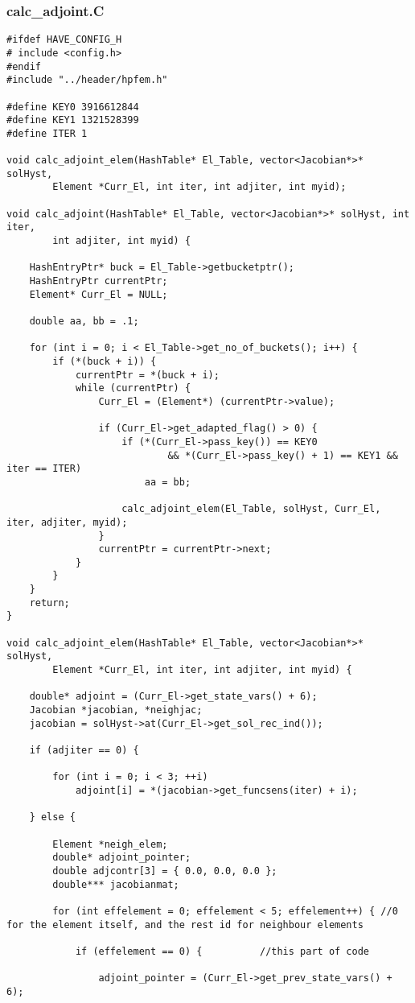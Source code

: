 \documentclass[a4paper,10pt]{article}
\begin{document}
\subsubsection{calc\_adjoint.C}
\begin{lstlisting}
#ifdef HAVE_CONFIG_H
# include <config.h>
#endif
#include "../header/hpfem.h"

#define KEY0 3916612844
#define KEY1 1321528399
#define ITER 1

void calc_adjoint_elem(HashTable* El_Table, vector<Jacobian*>* solHyst,
		Element *Curr_El, int iter, int adjiter, int myid);

void calc_adjoint(HashTable* El_Table, vector<Jacobian*>* solHyst, int iter,
		int adjiter, int myid) {

	HashEntryPtr* buck = El_Table->getbucketptr();
	HashEntryPtr currentPtr;
	Element* Curr_El = NULL;

	double aa, bb = .1;

	for (int i = 0; i < El_Table->get_no_of_buckets(); i++) {
		if (*(buck + i)) {
			currentPtr = *(buck + i);
			while (currentPtr) {
				Curr_El = (Element*) (currentPtr->value);

				if (Curr_El->get_adapted_flag() > 0) {
					if (*(Curr_El->pass_key()) == KEY0
							&& *(Curr_El->pass_key() + 1) == KEY1 && iter == ITER)
						aa = bb;

					calc_adjoint_elem(El_Table, solHyst, Curr_El, iter, adjiter, myid);
				}
				currentPtr = currentPtr->next;
			}
		}
	}
	return;
}

void calc_adjoint_elem(HashTable* El_Table, vector<Jacobian*>* solHyst,
		Element *Curr_El, int iter, int adjiter, int myid) {

	double* adjoint = (Curr_El->get_state_vars() + 6);
	Jacobian *jacobian, *neighjac;
	jacobian = solHyst->at(Curr_El->get_sol_rec_ind());

	if (adjiter == 0) {

		for (int i = 0; i < 3; ++i)
			adjoint[i] = *(jacobian->get_funcsens(iter) + i);

	} else {

		Element *neigh_elem;
		double* adjoint_pointer;
		double adjcontr[3] = { 0.0, 0.0, 0.0 };
		double*** jacobianmat;

		for (int effelement = 0; effelement < 5; effelement++) { //0 for the element itself, and the rest id for neighbour elements

			if (effelement == 0) {		    //this part of code

				adjoint_pointer = (Curr_El->get_prev_state_vars() + 6);


\end{lstlisting}
\end{document}
